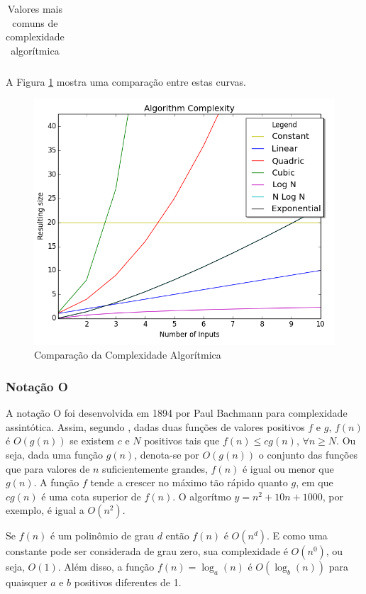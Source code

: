{\begin{table}[ht]
\begin{tabularx}{0.9\textwidth}{cX}
		\bottomrule
	\end{tabularx}
	\caption{ Valores mais comuns de complexidade algorítmica}
	\label{complexidadeAlgoritmica}
\end{table}

	A Figura \ref{compalg} mostra uma comparação entre estas curvas. 

	\begin{figure}[ht]
	\centering
		\includegraphics[keepaspectratio=true,scale=0.5]{figuras/compalg.png}
	\caption{Comparação da Complexidade Algorítmica}
	\label{compalg}
	\end{figure}

	\subsubsection{Notação O}

	
	A notação O foi desenvolvida em 1894 por Paul Bachmann para complexidade assintótica. Assim, segundo \cite{complexidade}, dadas duas funções de valores positivos $f$ e $g$, $f(n)$ é $O(g(n))$ se existem $c$ e $N$ positivos tais que $f(n) \leq cg(n)$, $\forall n \geq N$. Ou seja, dada uma função $g(n)$, denota-se por $O(g(n))$ o conjunto das funções que para valores de $n$ suficientemente grandes, $f(n)$ é igual ou menor que $g(n)$. A função $f$ tende a crescer no máximo tão rápido quanto $g$, em que $cg(n)$ é uma cota superior de $f(n)$. O algorítmo $y = n^{2} +10 n + 1000$, por exemplo, é igual a $O(n^2)$. 

	Se $f(n)$ é um polinômio de grau $d$  então $f(n)$ é $O(n^d)$. E como uma constante pode ser considerada de grau zero, sua complexidade é $O(n^0)$, ou seja, $O(1)$. Além disso, a função $f(n) = \log _a \left( n \right)$ é $O(\log _b \left( n \right))$ para quaisquer $a$ e $b$ positivos diferentes de 1. 

}
